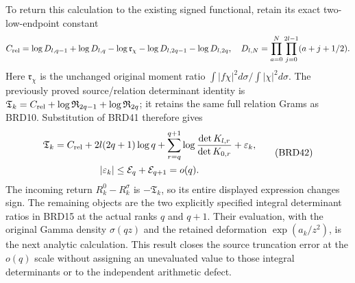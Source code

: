 To return this calculation to the existing signed functional,
retain its exact two-low-endpoint constant
\[
 C_{\rm rel}=\log D_{l,q-1}+\log D_{l,q}
 -\log\mathfrak r_\chi-\log D_{l,2q-1}-\log D_{l,2q},
 \quad D_{l,N}=\prod_{a=0}^N\prod_{j=0}^{2l-1}(a+j+1/2).
\]
Here $\mathfrak r_\chi$ is the unchanged original moment ratio
$\int|f\chi|^2d\sigma/\int|\chi|^2d\sigma$.
The previously proved source/relation determinant identity is
$\mathfrak T_k=C_{\rm rel}+\log\mathfrak R_{2q-1}
+\log\mathfrak R_{2q}$; it retains the same full relation Grams
as BRD10. Substitution of BRD41 therefore gives
\[
\begin{gathered}
 \mathfrak T_k=C_{\rm rel}+2l(2q+1)\log q
   +\sum_{r=q}^{q+1}\log\frac{\det K_{l,r}}{\det K_{0,r}}
   +\varepsilon_k,\\
 |\varepsilon_k|\leq\mathcal E_q+\mathcal E_{q+1}=o(q).
\end{gathered}\tag{BRD42}
\]
The incoming return $R_k^0-R_k^\sigma$ is $-\mathfrak T_k$,
so its entire displayed expression changes sign. The remaining
objects are the two explicitly specified integral determinant
ratios in BRD15 at the actual ranks $q$ and $q+1$. Their
evaluation, with the original Gamma density $\sigma(qz)$ and
the retained deformation $\exp(a_k/z^2)$, is the next analytic
calculation. This result closes the source truncation error at
the $o(q)$ scale without assigning an unevaluated value to those
integral determinants or to the independent arithmetic defect.
